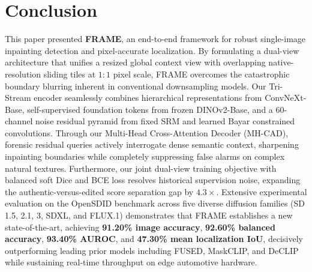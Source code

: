 \section{Conclusion}
\label{sec:conclusion}
This paper presented \textbf{FRAME}, an end-to-end framework for robust single-image inpainting detection and pixel-accurate localization. By formulating a dual-view architecture that unifies a resized global context view with overlapping native-resolution sliding tiles at $1:1$ pixel scale, FRAME overcomes the catastrophic boundary blurring inherent in conventional downsampling models. Our Tri-Stream encoder seamlessly combines hierarchical representations from ConvNeXt-Base, self-supervised foundation tokens from frozen DINOv2-Base, and a 60-channel noise residual pyramid from fixed SRM and learned Bayar constrained convolutions. Through our Multi-Head Cross-Attention Decoder (MH-CAD), forensic residual queries actively interrogate dense semantic context, sharpening inpainting boundaries while completely suppressing false alarms on complex natural textures. Furthermore, our joint dual-view training objective with balanced soft Dice and BCE loss resolves historical supervision noise, expanding the authentic-versus-edited score separation gap by $4.3\times$. Extensive experimental evaluation on the OpenSDID benchmark across five diverse diffusion families (SD 1.5, 2.1, 3, SDXL, and FLUX.1) demonstrates that FRAME establishes a new state-of-the-art, achieving \textbf{91.20\% image accuracy}, \textbf{92.60\% balanced accuracy}, \textbf{93.40\% AUROC}, and \textbf{47.30\% mean localization IoU}, decisively outperforming leading prior models including FUSED, MaskCLIP, and DeCLIP while sustaining real-time throughput on edge automotive hardware.
